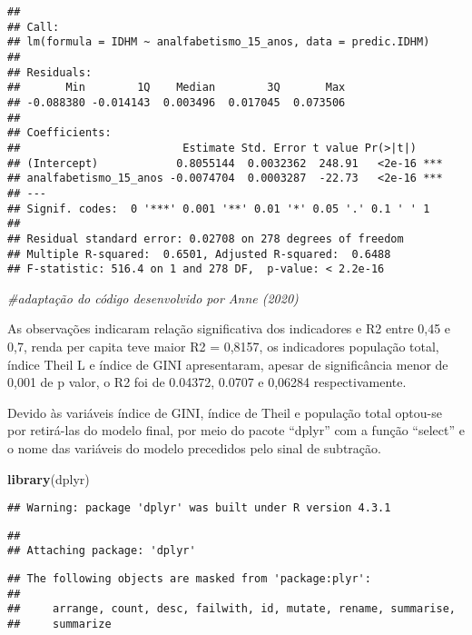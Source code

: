\documentclass[
]{article}
\newenvironment{Shaded}{\begin{snugshade}}{\end{snugshade}}
\newcommand{\CommentTok}[1]{\textcolor[rgb]{0.56,0.35,0.01}{\textit{#1}}}
\newcommand{\FunctionTok}[1]{\textcolor[rgb]{0.13,0.29,0.53}{\textbf{#1}}}
\newcommand{\NormalTok}[1]{#1}
\begin{document}
\begin{verbatim}
## 
## Call:
## lm(formula = IDHM ~ analfabetismo_15_anos, data = predic.IDHM)
## 
## Residuals:
##       Min        1Q    Median        3Q       Max 
## -0.088380 -0.014143  0.003496  0.017045  0.073506 
## 
## Coefficients:
##                         Estimate Std. Error t value Pr(>|t|)    
## (Intercept)            0.8055144  0.0032362  248.91   <2e-16 ***
## analfabetismo_15_anos -0.0074704  0.0003287  -22.73   <2e-16 ***
## ---
## Signif. codes:  0 '***' 0.001 '**' 0.01 '*' 0.05 '.' 0.1 ' ' 1
## 
## Residual standard error: 0.02708 on 278 degrees of freedom
## Multiple R-squared:  0.6501, Adjusted R-squared:  0.6488 
## F-statistic: 516.4 on 1 and 278 DF,  p-value: < 2.2e-16
\end{verbatim}

\begin{Shaded}
\begin{Highlighting}[]
\CommentTok{\#adaptação do código desenvolvido por Anne (2020)}
\end{Highlighting}
\end{Shaded}

As observações indicaram relação significativa dos indicadores e R2
entre 0,45 e 0,7, renda per capita teve maior R2 = 0,8157, os
indicadores população total, índice Theil L e índice de GINI
apresentaram, apesar de significância menor de 0,001 de p valor, o R2
foi de 0.04372, 0.0707 e 0,06284 respectivamente.

Devido às variáveis índice de GINI, índice de Theil e população total
optou-se por retirá-las do modelo final, por meio do pacote ``dplyr''
com a função ``select'' e o nome das variáveis do modelo precedidos pelo
sinal de subtração.

\begin{Shaded}
\begin{Highlighting}[]
\FunctionTok{library}\NormalTok{(dplyr)}
\end{Highlighting}
\end{Shaded}

\begin{verbatim}
## Warning: package 'dplyr' was built under R version 4.3.1
\end{verbatim}

\begin{verbatim}
## 
## Attaching package: 'dplyr'
\end{verbatim}

\begin{verbatim}
## The following objects are masked from 'package:plyr':
## 
##     arrange, count, desc, failwith, id, mutate, rename, summarise,
##     summarize
\end{verbatim}
\end{document}
